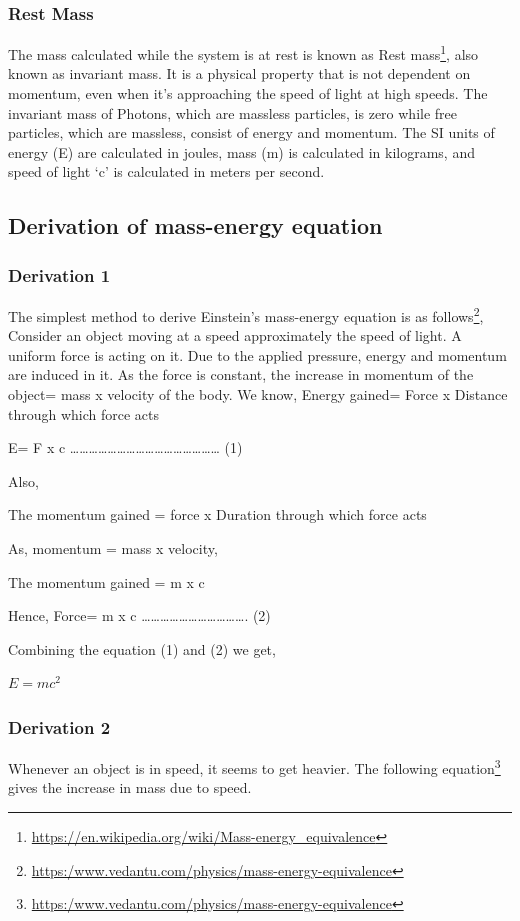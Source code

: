 \documentclass{article}
\begin{document}
\subsubsection{Rest Mass}
The mass calculated while the system is at rest is known as Rest mass\footnote{\url{https://en.wikipedia.org/wiki/Mass-energy_equivalence}}, also known as invariant mass. 
It is a physical property that is not dependent on momentum, even when it’s approaching the speed of light at high speeds. 
The invariant mass of Photons, which are massless particles, is zero while free particles, which are massless, consist of energy and momentum. 
The SI units of energy (E) are calculated in joules, mass (m) is calculated in kilograms, and speed of light ‘c’ is calculated in meters per second.

\subsection{Derivation of mass-energy equation}
\subsubsection{Derivation 1}
The simplest method to derive Einstein’s mass-energy equation is as follows\footnote{\url{https:/www.vedantu.com/physics/mass-energy-equivalence}},
Consider an object moving at a speed approximately the speed of light.
A uniform force is acting on it. Due to the applied pressure, energy and momentum are induced in it.
As the force is constant, the increase in momentum of the object= mass x velocity of the body.
We know,
Energy gained= Force x Distance through which force acts

E= F x c 	………………………………………… (1)


Also,


The momentum gained = force x Duration through which force acts


As, momentum = mass x velocity,


The momentum gained = m x c

Hence, Force= m x c ……………………………. (2)


Combining the equation (1) and (2) we get,


$E= mc^2$
\subsubsection{Derivation 2}
Whenever an object is in speed, it seems to get heavier. The following equation\footnote{\url{https:/www.vedantu.com/physics/mass-energy-equivalence}} gives the increase in mass due to speed.
\end{document}
